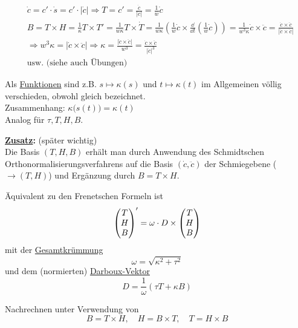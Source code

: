 \begin{beweis}
 \begin{align*}
  &\dot c = c' \cdot \dot s = c' \cdot |\dot c| \Rightarrow T = c' = \frac{\dot c}{|\dot c|} = \frac1w \dot c \\
  &B = T \times H = \frac1\kappa T \times T' = \frac1{w \kappa} T\times \dot T = \frac1{w \kappa} \left(\frac1w \dot c \times \frac{\dd}{\dd t}{\left(\frac1w \dot c\right)}\right) = \frac1{w^3 \kappa} \dot c \times \ddot c = \frac{\dot c \times \ddot c}{|\dot c \times \ddot c|} \\
  &\Rightarrow w^3 \kappa = |\dot c \times \ddot c| \Rightarrow \kappa = \frac{|\dot c \times \ddot c|}{w^3} = \frac{\dot c \times \ddot c}{|\dot c|^3} \\
  &\text{usw. (siehe auch Übungen)}
 \end{align*}

\end{beweis}

\begin{bemerkung}
 Als \uline{Funktionen} sind z.B. \(s \mapsto \kappa(s)\) und \(t \mapsto \kappa(t)\) im Allgemeinen völlig verschieden, obwohl gleich bezeichnet. \\
 Zusammenhang: \(\kappa\big(s(t)\big) = \kappa(t)\) \\
 Analog für \(\tau, T, H, B\).
\end{bemerkung}

\textbf{\uline{Zusatz}:} (später wichtig) \\
Die Basis \((T, H, B)\) erhält man durch Anwendung des Schmidtschen Orthonormalisierungsverfahrens auf die Basis \((\dot c, \ddot c)\) der Schmiegebene \big(\(\rightarrow (T,H)\)\big) und Ergänzung durch \(B = T \times H\).

\begin{satz}\label{satz135}
 Äquivalent zu den Frenetschen Formeln ist
 \[
  {\begin{pmatrix} T \\ H \\ B \end{pmatrix} }' = \omega \cdot D \times \begin{pmatrix} T \\ H \\ B \end{pmatrix} 
 \]
 mit der \uline{Gesamtkrümmung}
 \[
  \omega = \sqrt{\kappa^2 + \tau^2}
 \]
 und dem (normierten) \uline{Darboux-Vektor}
 \[
  D = \frac1\omega (\tau T + \kappa B)
 \]
\end{satz}

\begin{beweis}
Nachrechnen unter Verwendung von
\[
 B = T \times H, \quad H = B \times T, \quad T = H \times B
\]
\end{beweis}

